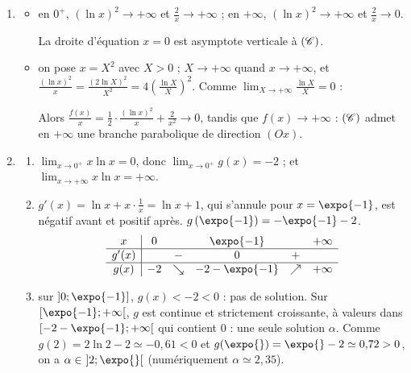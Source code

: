 	\begin{enumerate}
		\item \begin{itemize}
			\item {}
				en $0^+$, $(\ln x)^2 \to +\infty$ et $\frac{2}{x} \to +\infty$ ; en $+\infty$, $(\ln x)^2 \to +\infty$ et $\frac{2}{x} \to 0$.


				La droite d'équation $x = 0$ est asymptote verticale à $(\mathscr{C})$.
			\item {}
				on pose $x = X^2$ avec $X > 0$ ; $X \to +\infty$ quand $x \to +\infty$, et
				$\frac{(\ln x)^2}{x} = \frac{(2\ln X)^2}{X^2} = 4\left(\frac{\ln X}{X}\right)^2$.
				Comme $\lim_{X\to+\infty}\frac{\ln X}{X} = 0$ :


				Alors $\frac{f(x)}{x} = \frac{1}{2}\cdot\frac{(\ln x)^2}{x} + \frac{2}{x^2} \to 0$, tandis que $f(x) \to +\infty$ :
				$(\mathscr{C})$ admet en $+\infty$ une branche parabolique de direction $(Ox)$.
		\end{itemize}
		\item \begin{enumerate}
			\item {}
				$\lim_{x\to0^+} x\ln x = 0$, donc $\lim_{x\to0^+} g(x) = -2$ ; et $\lim_{x\to+\infty} x\ln x = +\infty$.

			\item {}
				$g'(x) = \ln x + x\cdot\frac{1}{x} = \ln x + 1$, qui s'annule pour $x = \expo{-1}$, est négatif avant et positif après.
				$g\left(\expo{-1}\right) = -\expo{-1} - 2$.
				\[
				\begin{array}{c|ccccc}
					x & 0 & & \expo{-1} & & +\infty \\ \hline
					g'(x) & & - & 0 & + & \\ \hline
					g(x) & -2 & \searrow & -2 - \expo{-1} & \nearrow & +\infty
				\end{array}
				\]
			\item {}
				sur $\left]0;\expo{-1}\right]$, $g(x) < -2 < 0$ : pas de solution.
				Sur $\left[\expo{-1};+\infty\right[$, $g$ est continue et strictement croissante, à valeurs dans
				$\left[-2-\expo{-1};+\infty\right[$ qui contient $0$ : une seule solution $\alpha$.
				Comme $g(2) = 2\ln 2 - 2 \simeq -0{,}61 < 0$ et $g(\expo{}) = \expo{} - 2 \simeq 0{,}72 > 0$, on a $\alpha \in\ ]2;\expo{}[$
				(numériquement $\alpha \simeq 2{,}35$).


\end{enumerate}
\end{enumerate}
